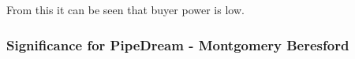\documentclass[11pt]{article}		%
\begin{document}
                From this it can be seen that buyer power is low.
                 
                
                
            
               
           \subsubsection{Significance for PipeDream - Montgomery Beresford} \label{pricingpower}
           
\end{document}
